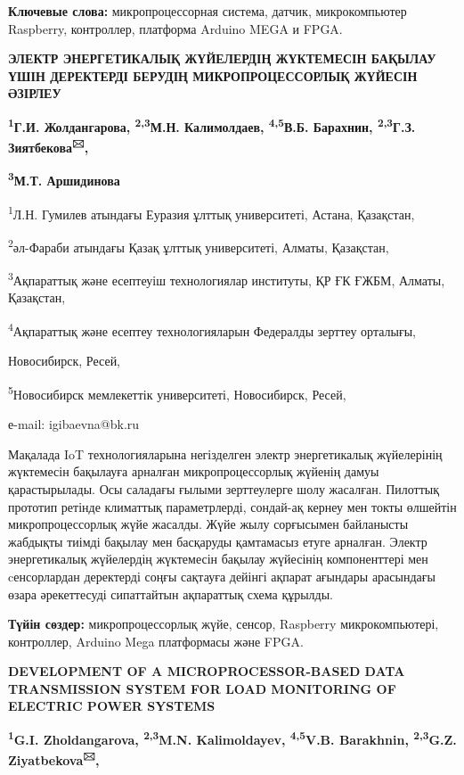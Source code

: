 {\bfseries Ключевые слова:} микропроцессорная система, датчик,
микрокомпьютер Raspberry, контроллер, платформа Arduino MEGA и FPGA.

{\bfseries ЭЛЕКТР ЭНЕРГЕТИКАЛЫҚ ЖҮЙЕЛЕРДІҢ ЖҮКТЕМЕСІН БАҚЫЛАУ ҮШІН
ДЕРЕКТЕРДІ БЕРУДІҢ МИКРОПРОЦЕССОРЛЫҚ ЖҮЙЕСІН ӘЗІРЛЕУ}

{\bfseries \textsuperscript{1}Г.И. Жолдангарова, \textsuperscript{2,3}М.Н.
Калимолдаев, \textsuperscript{4,5}В.Б. Барахнин,
\textsuperscript{2,3}Г.З. Зиятбекова\textsuperscript{🖂},}

{\bfseries \textsuperscript{3}М.Т. Аршидинова}

\textsuperscript{1}Л.Н. Гумилев атындағы Еуразия ұлттық университеті,
Астана, Қазақстан,

\textsuperscript{2}әл-Фараби атындағы Қазақ ұлттық университеті, Алматы,
Қазақстан,

\textsuperscript{3}Ақпараттық және есептеуіш технологиялар институты, ҚР
ҒК ҒЖБМ, Алматы, Қазақстан,

\textsuperscript{4}Ақпараттық және есептеу технологияларын Федералды
зерттеу орталығы,

Новосибирск, Ресей,

\textsuperscript{5}Новосибирск мемлекеттік университеті, Новосибирск,
Ресей,

е-mail: igibaevna@bk.ru

Мақалада IoT технологияларына негізделген электр энергетикалық
жүйелерінің жүктемесін бақылауға арналған микропроцессорлық жүйенің
дамуы қарастырылады. Осы саладағы ғылыми зерттеулерге шолу жасалған.
Пилоттық прототип ретінде климаттық параметрлерді, сондай-ақ кернеу мен
токты өлшейтін микропроцессорлық жүйе жасалды. Жүйе жылу сорғысымен
байланысты жабдықты тиімді бақылау мен басқаруды қамтамасыз етуге
арналған. Электр энергетикалық жүйелердің жүктемесін бақылау жүйесінің
компоненттері мен cенсорлардан деректерді соңғы сақтауға дейінгі ақпарат
ағындары арасындағы өзара әрекеттесуді сипаттайтын ақпараттық схема
құрылды.

{\bfseries Түйін сөздер:} микропроцессорлық жүйе, сенсор, Raspberry
микрокомпьютері, контроллер, Arduino Mega платформасы және FPGA.

{\bfseries DEVELOPMENT OF A MICROPROCESSOR-BASED DATA TRANSMISSION SYSTEM
FOR LOAD MONITORING OF ELECTRIC POWER SYSTEMS}

{\bfseries \textsuperscript{1}G.I. Zholdangarova, \textsuperscript{2,3}M.N.
Kalimoldayev, \textsuperscript{4,5}V.B. Barakhnin,
\textsuperscript{2,3}G.Z. Ziyatbekova\textsuperscript{🖂},}

